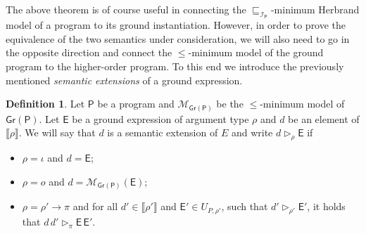 \documentclass[submission,copyright]{eptcs}
\theoremstyle{definition}
\newtheorem{definition}{Definition}
\newcommand{\mo}[1]{\llbracket#1\rrbracket}
\newcommand{\aleq}[1][]{\sqsubseteq_{#1}}
\newcommand{\ee}[1][I]{\rhd_{#1}}
\newcommand{\bezem}{\mathcal{M}_\mathsf{Gr(P)}}
\begin{document}
{The above theorem is of course useful in connecting the
$\aleq[\mathcal{I}_\mathsf{P}]$-minimum Herbrand model of a program to its ground instantiation. However,
in order to prove the equivalence of the two semantics under consideration,
we will also need to go in the opposite direction and connect the $\leq$-minimum model of the ground program to the higher-order program. To this end we
introduce the previously mentioned \emph{semantic extensions} of a ground
expression.}
\begin{definition}
Let $\mathsf{P}$ be a program and $\bezem$ be the $\leq$-minimum model of $\mathsf{Gr(P)}$.
Let $\mathsf{E}$ be a ground expression of argument type $\rho$ and $d$ be an
element of $\mo{\rho}$. We will say that $d$ is a semantic extension of $E$ and
write $d \ee[\rho] \mathsf{E}$ if
\begin{itemize}
\item $\rho = \iota$ and $d = \mathsf{E}$;
\item $\rho = o$ and $d = \bezem(\mathsf{E})$;
\item $\rho = \rho' \rightarrow \pi$ and for all $d' \in \mo{\rho'}$ and $\mathsf{E}' \in U_{P,\rho'}$,
      such that $d' \ee[\rho'] \mathsf{E}'$, it holds that $d \, d' \ee[\pi] \mathsf{E} \, \mathsf{E}'$.
\end{itemize}
\end{definition}
\end{document}
